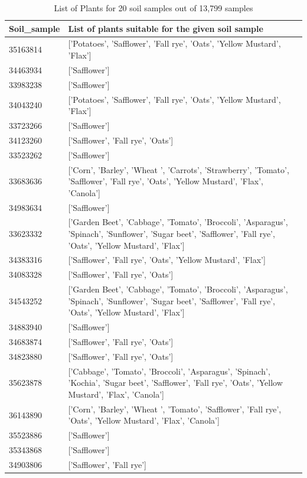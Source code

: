 \begin{table}[h!]
    \centering
    \begin{tabular}{|m{}|m{}|}
    \hline
        \textbf{Soil\_sample} & \textbf{List of plants suitable for the given soil sample} \\ \hline
        35163814 & ['Potatoes', 'Safflower', 'Fall rye', 'Oats', 'Yellow Mustard', 'Flax'] \\ \hline
        34463934 & ['Safflower'] \\ \hline
        33983238 & ['Safflower'] \\ \hline
        34043240 & ['Potatoes', 'Safflower', 'Fall rye', 'Oats', 'Yellow Mustard', 'Flax'] \\ \hline
        33723266 & ['Safflower'] \\ \hline
        34123260 & ['Safflower', 'Fall rye', 'Oats'] \\ \hline
        33523262 & ['Safflower'] \\ \hline
        33683636 & ['Corn', 'Barley', 'Wheat ', 'Carrots', 'Strawberry', 'Tomato', 'Safflower', 'Fall rye', 'Oats', 'Yellow Mustard', 'Flax', 'Canola'] \\ \hline
        34983634 & ['Safflower'] \\ \hline
        33623332 & ['Garden Beet', 'Cabbage', 'Tomato', 'Broccoli', 'Asparagus', 'Spinach', 'Sunflower', 'Sugar beet', 'Safflower', 'Fall rye', 'Oats', 'Yellow Mustard', 'Flax'] \\ \hline
        34383316 & ['Safflower', 'Fall rye', 'Oats', 'Yellow Mustard', 'Flax'] \\ \hline
        34083328 & ['Safflower', 'Fall rye', 'Oats'] \\ \hline
        34543252 & ['Garden Beet', 'Cabbage', 'Tomato', 'Broccoli', 'Asparagus', 'Spinach', 'Sunflower', 'Sugar beet', 'Safflower', 'Fall rye', 'Oats', 'Yellow Mustard', 'Flax'] \\ \hline
        34883940 & ['Safflower'] \\ \hline
        34683874 & ['Safflower', 'Fall rye', 'Oats'] \\ \hline
        34823880 & ['Safflower', 'Fall rye', 'Oats'] \\ \hline
        35623878 & ['Cabbage', 'Tomato', 'Broccoli', 'Asparagus', 'Spinach', 'Kochia', 'Sugar beet', 'Safflower', 'Fall rye', 'Oats', 'Yellow Mustard', 'Flax', 'Canola'] \\ \hline
        36143890 & ['Corn', 'Barley', 'Wheat ', 'Tomato', 'Safflower', 'Fall rye', 'Oats', 'Yellow Mustard', 'Flax', 'Canola'] \\ \hline
        35523886 & ['Safflower'] \\ \hline
        35343868 & ['Safflower'] \\ \hline
        34903806 & ['Safflower', 'Fall rye'] \\ \hline
    \end{tabular}
    \caption{List of Plants for 20 soil samples out of 13,799 samples}
    \label{table:soilPlantsResult}
\end{table}

